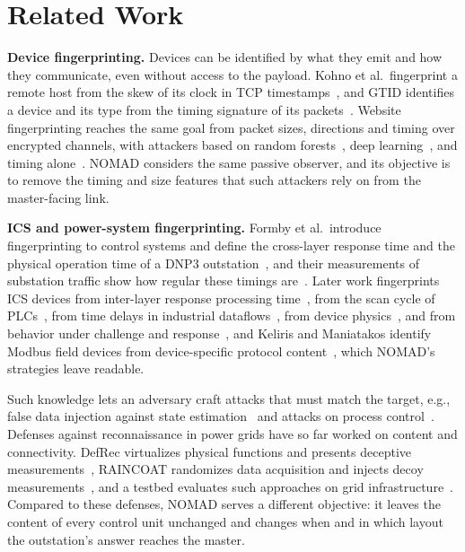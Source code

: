 \section{Related Work}
\label{sec:related}

\textbf{Device fingerprinting.} Devices can be identified by what they emit and how they communicate, even without access to the payload. Kohno et al.\ fingerprint a remote host from the skew of its clock in TCP timestamps~\cite{kohno2005}, and GTID identifies a device and its type from the timing signature of its packets~\cite{gtid2015}. Website fingerprinting reaches the same goal from packet sizes, directions and timing over encrypted channels, with attackers based on random forests~\cite{kfp2016}, deep learning~\cite{sirinam2018}, and timing alone~\cite{tiktok2020}. NOMAD considers the same passive observer, and its objective is to remove the timing and size features that such attackers rely on from the master-facing link.

\textbf{ICS and power-system fingerprinting.} Formby et al.\ introduce fingerprinting to control systems and define the cross-layer response time and the physical operation time of a DNP3 outstation~\cite{formby2016}, and their measurements of substation traffic show how regular these timings are~\cite{formby2017}. Later work fingerprints ICS devices from inter-layer response processing time~\cite{shen2018}, from the scan cycle of PLCs~\cite{ahmed2021}, from time delays in industrial dataflows~\cite{pospisil2023}, from device physics~\cite{gu2018}, and from behavior under challenge and response~\cite{babun2021}, and Keliris and Maniatakos identify Modbus field devices from device-specific protocol content~\cite{keliris2016}, which NOMAD's strategies leave readable.

Such knowledge lets an adversary craft attacks that must match the target, e.g., false data injection against state estimation~\cite{liufdia2009} and attacks on process control~\cite{cardenas2011}. Defenses against reconnaissance in power grids have so far worked on content and connectivity. DefRec virtualizes physical functions and presents deceptive measurements~\cite{defrec2020}, RAINCOAT randomizes data acquisition and injects decoy measurements~\cite{raincoat2019}, and a testbed evaluates such approaches on grid infrastructure~\cite{lintestbed2020}. Compared to these defenses, NOMAD serves a different objective: it leaves the content of every control unit unchanged and changes when and in which layout the outstation's answer reaches the master.

